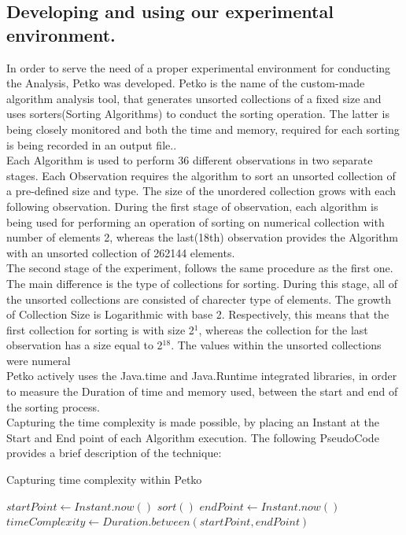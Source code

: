 \documentclass[]{report}
\begin{document}
	\subsection{Developing and using our experimental environment.}
	In order to serve the need of a proper experimental environment  for conducting the Analysis, Petko was developed. Petko is the name of the custom-made  algorithm analysis tool, that generates unsorted collections of a fixed size and uses sorters(Sorting Algorithms) to conduct the sorting operation. The latter is being closely monitored and both the time and memory, required for each sorting is being recorded in an output file.. \\
	Each Algorithm is used to perform 36 different observations in two separate stages. Each Observation requires the algorithm to sort an unsorted collection of a pre-defined size and type. The size of the unordered collection grows with each following observation. During the first stage of observation, each algorithm is being used for performing an operation of sorting on numerical collection with number of elements 2, whereas the last(18th) observation provides the Algorithm with an unsorted collection of 262144 elements. \\
	The second stage of the experiment, follows the same procedure as the first one. The main difference is the type of collections for sorting. During this stage, all of the unsorted collections are consisted of charecter type of elements.
	 The growth of Collection Size is Logarithmic with base 2. Respectively, this means that the first collection for sorting is with size 2$^{1}$, whereas the collection for the last observation has a size equal to 2$^{18}$. The values within the unsorted collections were numeral\\
	Petko actively uses the Java.time and Java.Runtime integrated libraries, in order to measure the Duration of time and memory used, between the start and end of the sorting process. \\
	Capturing the time complexity is made possible, by placing an Instant at the Start and End point of each Algorithm execution. The following PseudoCode provides a brief description of the technique:
	

\begin{algorithm}
	\caption{Capturing time complexity within Petko}\label{alg:cap}
	\begin{algorithmic}
	\State $startPoint \gets Instant.now()$   
	\State $sort()$
	\State $endPoint \gets Instant.now()$
	\State $timeComplexity \gets Duration.between(startPoint, endPoint)$
	\end{algorithmic}
\end{algorithm}
\end{document}
